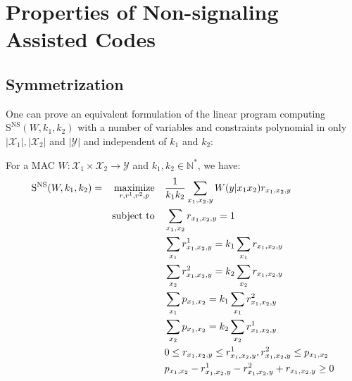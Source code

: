 \section{Properties of Non-signaling Assisted Codes}
\label{section:complexity}
\subsection{Symmetrization}
One can prove an equivalent formulation of the linear program computing $\mathrm{S}^{\mathrm{NS}}(W,k_1,k_2)$ with a number of variables and constraints polynomial in only $|\mathcal{X}_1|,|\mathcal{X}_2|$ and $|\mathcal{Y}|$ and independent of $k_1$ and $k_2$:
\begin{proposition}
  \label{prop:NSLP}
  For a MAC $W: \mathcal{X}_1 \times \mathcal{X}_2 \rightarrow \mathcal{Y}$ and $k_1,k_2 \in \mathbb{N}^*$, we have:
  \begin{equation}
  \begin{aligned}
    \mathrm{S}^{\mathrm{NS}}(W,k_1,k_2) = &&\underset{r,r^1,r^2,p}{\operatorname{\text{maximize}}} &&& \frac{1}{k_1k_2} \sum_{x_1,x_2,y} W(y|x_1x_2)r_{x_1,x_2,y}\\
    &&\operatorname{\text{subject to}} &&& \sum_{x_1,x_2} r_{x_1,x_2,y} = 1\\
    &&&&& \sum_{x_1} r^1_{x_1,x_2,y} = k_1 \sum_{x_1} r_{x_1,x_2,y}\\
    &&&&& \sum_{x_2} r^2_{x_1,x_2,y} = k_2 \sum_{x_2} r_{x_1,x_2,y}\\
    &&&&& \sum_{x_1} p_{x_1,x_2} = k_1 \sum_{x_1} r^2_{x_1,x_2,y}\\
    &&&&& \sum_{x_2} p_{x_1,x_2} = k_2 \sum_{x_2} r^1_{x_1,x_2,y}\\
    &&&&& 0 \leq r_{x_1,x_2,y} \leq r^1_{x_1,x_2,y},r^2_{x_1,x_2,y} \leq p_{x_1,x_2}\\
    &&&&& p_{x_1,x_2} -  r^1_{x_1,x_2,y} - r^2_{x_1,x_2,y} + r_{x_1,x_2,y} \geq 0
  \end{aligned}
  \end{equation}

\end{proposition}

